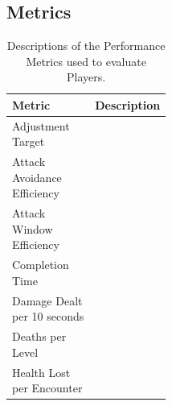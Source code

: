 \subsection{Metrics}




\begin{table}[!ht]
    \begin{center}
      \caption{Descriptions of the Performance Metrics used to evaluate Players.}
      \label{tab:descriptions-performance-metrics}
      \begin{tabular}{ m{6em} m{27em} } %
        \addlinespace
        \toprule
        \bf Metric & \bf Description  \\
        \midrule
        \makecell[c]{Adjustment\\Target} & \\
        \makecell[c]{Attack\\Avoidance\\Efficiency} & \\
        \makecell[c]{Attack\\Window\\Efficiency} & \\
        \makecell[c]{Completion\\Time} & \\
        \makecell[c]{Damage Dealt\\per 10 seconds} & \\
        \makecell[c]{Deaths per\\Level} & \\
        \makecell[c]{Health Lost\\per Encounter} & \\
        \bottomrule
      \end{tabular}
    \end{center}
\end{table}

